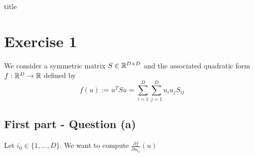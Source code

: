\documentclass[12pt]{article}
\begin{document}

{title}

\tableofcontents

\restoregeometry

\section{Exercise 1}
We consider a symmetric matrix \(S \in \mathbb{R}^{D \times D}\) and the associated quadratic form $f: \mathbb{R}^{D} \to \mathbb{R}$ defined by
$$
    f(u) := u^{T} S u = \sum_{i=1}^{D} \sum_{j=1}^{D} u_{i} u_{j} S_{i j}
$$

\subsection{First part - Question (a)}
\label{ex1.I.a}
Let \(i_0 \in \{1, \ldots, D\}\). We want to compute \(\frac{\partial f}{\partial u_{i_0}} (u)\)
\end{document}
